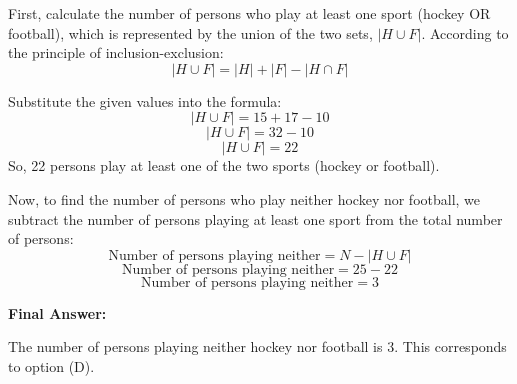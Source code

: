 \documentclass[a4paper,12pt]{article}
\begin{document}
First, calculate the number of persons who play at least one sport (hockey OR football), which is represented by the union of the two sets, $|H \cup F|$.
According to the principle of inclusion-exclusion:
$$|H \cup F| = |H| + |F| - |H \cap F|$$

Substitute the given values into the formula:
$$|H \cup F| = 15 + 17 - 10$$
$$|H \cup F| = 32 - 10$$
$$|H \cup F| = 22$$
So, 22 persons play at least one of the two sports (hockey or football).

Now, to find the number of persons who play neither hockey nor football, we subtract the number of persons playing at least one sport from the total number of persons:
$$\text{Number of persons playing neither} = N - |H \cup F|$$
$$\text{Number of persons playing neither} = 25 - 22$$
$$\text{Number of persons playing neither} = 3$$

\textbf{Final Answer:}

The number of persons playing neither hockey nor football is 3. This corresponds to option (D).
\end{document}
